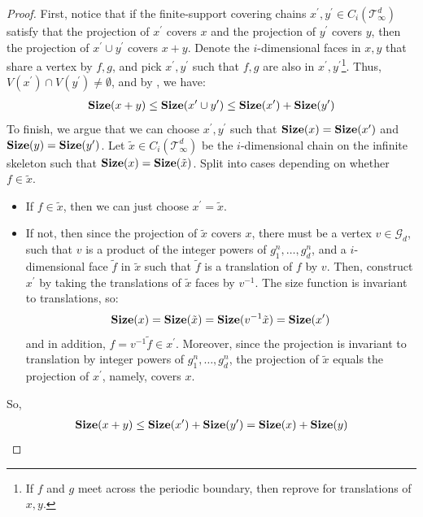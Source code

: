 \begin{proof}
  First, notice that if the finite-support covering chains $x^{\prime}, y^{\prime} \in C_{i}(\mathcal T_\infty^d)$ satisfy that the projection of $x^{\prime}$ covers $x$ and the projection of $y^{\prime}$ covers $y$, then the projection of $x^{\prime} \cup y^{\prime}$ covers $x+y$. Denote the $i$-dimensional faces in $x, y$ that share a vertex by $f,g$, and pick $x^{\prime}, y^{\prime}$ such that $f, g$ are also in $x^{\prime}, y^{\prime}$\footnote{If $f$ and $g$ meet across the periodic boundary, then reprove for translations of $x,y$. }. Thus, $V(x^{\prime})\cap V(y^{\prime}) \neq \emptyset$, and by , we have:
  \begin{equation*}
    \begin{split}
      \mathbf{Size}(x + y) \le \mathbf{Size}(x^{\prime} \cup y^{\prime}) \le \mathbf{Size}(x^{\prime}) + \mathbf{Size}(y^{\prime})
    \end{split}
  \end{equation*}
To finish, we argue that we can choose $x^{\prime}, y^{\prime}$ such that $\mathbf{Size}(x) = \mathbf{Size}(x^{\prime})$ and $\mathbf{Size}(y) = \mathbf{Size}(y^{\prime})$. Let $\tilde{x} \in C_{i}(\mathcal T_\infty^d)$ be the $i$-dimensional chain on the infinite skeleton such that $\mathbf{Size}(x) = \mathbf{Size}(\tilde{x})$. Split into cases depending on whether $f \in \tilde{x}$.
  \begin{itemize}
    \item If $f \in \tilde{x}$, then we can just choose $x^{\prime} = \tilde{x}$.
    \item If not, then since the projection of $\tilde{x}$ covers $x$, there must be a vertex $v \in \mathcal{G}_{d}$, such that $v$ is a product of the integer powers of $g_{1}^{n},\ldots, g_{d}^{n}$, and a $i$-dimensional face $\tilde{f}$ in $\tilde{x}$ such that $\tilde{f}$ is a translation of $f$ by $v$. Then, construct $x^{\prime}$ by taking the translations of $\tilde{x}$ faces by $v^{-1}$. The size function is invariant to translations, so:
      \begin{equation*}
        \begin{split}
          \mathbf{Size}(x) = \mathbf{Size}(\tilde{x}) = \mathbf{Size}(v^{-1}\tilde{x}) = \mathbf{Size}(x^{\prime})
        \end{split}
      \end{equation*}
      and in addition, $f = v^{-1}\tilde{f} \in x^{\prime}$. Moreover, since the projection is invariant to translation by integer powers of $g_{1}^{n},\ldots, g_{d}^{n}$, the projection of $\tilde{x}$ equals the projection of $x^{\prime}$, namely, covers $x$.
  \end{itemize}
  So, 
  \begin{equation*}
    \begin{split}
      \mathbf{Size}(x + y) \le \mathbf{Size}(x^{\prime}) + \mathbf{Size}(y^{\prime}) = \mathbf{Size}(x) + \mathbf{Size}(y)
    \end{split}
  \end{equation*}
\end{proof}


